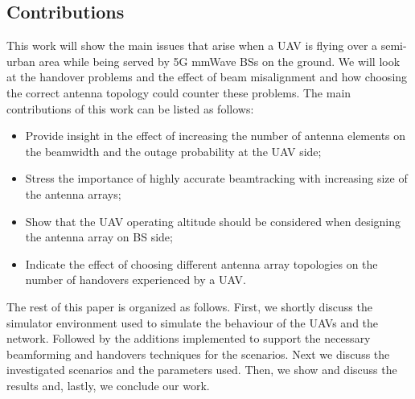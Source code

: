 \documentclass[conference,twocolumn]{IEEEtran}
\newcommand{\sofie}[1]{{\color{red}[sp: #1]}}
\begin{document}
\subsection{Contributions}
\par This work will show the main issues that arise when a UAV is flying over a semi-urban area while being served by 5G mmWave BSs on the ground. We will look at the handover problems and the effect of beam misalignment and how choosing the correct antenna topology could counter these problems. The main contributions of this work can be listed as follows:
\begin{itemize}
    \item Provide insight in the effect of increasing the number of antenna elements on the beamwidth and the outage probability at the UAV side;
    \item Stress the importance of highly accurate beamtracking with increasing size of the antenna arrays;
    \item Show that the UAV operating altitude should be considered when designing the antenna array on BS side;
    \item Indicate the effect of choosing different antenna array topologies on the number of handovers experienced by a UAV.
\end{itemize}
The rest of this paper is organized as follows. First, we shortly discuss the simulator environment used to simulate the behaviour of the UAVs and the network. Followed by the additions implemented to support the necessary beamforming and handovers techniques for the scenarios. Next we discuss the investigated scenarios and the parameters used. Then, we show and discuss the results and, lastly, we conclude our work. 
\end{document}
